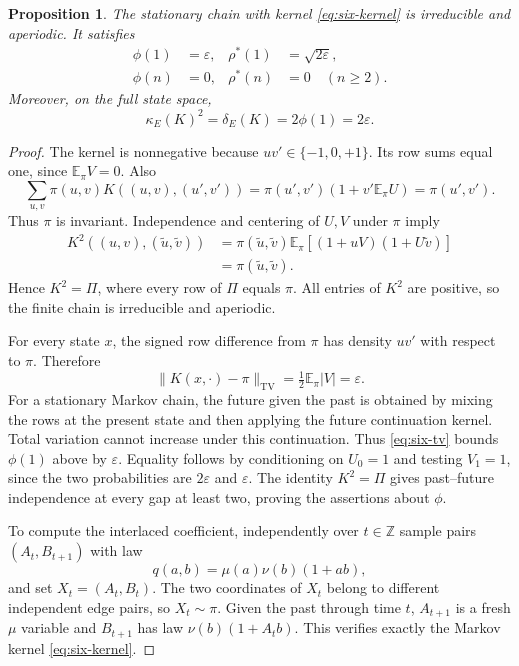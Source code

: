 \documentclass[11pt]{amsart}
\numberwithin{equation}{section}
\newtheorem{proposition}[theorem]{Proposition}
\theoremstyle{definition}
\newcommand{\EE}{\mathbb E}
\newcommand{\ZZ}{\mathbb Z}
\newcommand{\TV}{\mathrm{TV}}
\newcommand{\rhostar}{\rho^{*}}
\begin{document}
\begin{proposition}\label{prop:six}
The stationary chain with kernel \eqref{eq:six-kernel} is irreducible and aperiodic. It satisfies
\begin{align}
\phi(1)&=\varepsilon,&\rhostar(1)&=\sqrt{2\varepsilon},\label{eq:six-exact}\\
\phi(n)&=0,&\rhostar(n)&=0\quad(n\ge2).\label{eq:six-zero}
\end{align}
Moreover, on the full state space,
\begin{equation}\label{eq:six-robust}
\kappa_E(K)^2=\delta_E(K)=2\phi(1)=2\varepsilon.
\end{equation}
\end{proposition}

\begin{proof}
The kernel is nonnegative because $uv'\in\{-1,0,+1\}$. Its row sums equal one, since $\EE_\pi V=0$. Also
\[
\sum_{u,v}\pi(u,v)K((u,v),(u',v'))
=\pi(u',v')(1+v'\EE_\pi U)=\pi(u',v').
\]
Thus $\pi$ is invariant. Independence and centering of $U,V$ under $\pi$ imply
\begin{align*}
K^2((u,v),(\widetilde u,\widetilde v))
&=\pi(\widetilde u,\widetilde v)
  \EE_\pi[(1+uV)(1+U\widetilde v)]\\
&=\pi(\widetilde u,\widetilde v).
\end{align*}
Hence $K^2=\Pi$, where every row of $\Pi$ equals $\pi$. All entries of $K^2$ are positive, so the finite chain is irreducible and aperiodic.

For every state $x$, the signed row difference from $\pi$ has density $uv'$ with respect to $\pi$. Therefore
\begin{equation}\label{eq:six-tv}
\|K(x,\cdot)-\pi\|_{\TV}=\tfrac12\EE_\pi|V|=\varepsilon.
\end{equation}
For a stationary Markov chain, the future given the past is obtained by mixing the rows at the present state and then applying the future continuation kernel. Total variation cannot increase under this continuation. Thus \eqref{eq:six-tv} bounds $\phi(1)$ above by $\varepsilon$. Equality follows by conditioning on $U_0=1$ and testing $V_1=1$, since the two probabilities are $2\varepsilon$ and $\varepsilon$. The identity $K^2=\Pi$ gives past--future independence at every gap at least two, proving the assertions about $\phi$.

To compute the interlaced coefficient, independently over $t\in\ZZ$ sample pairs $(A_t,B_{t+1})$ with law
\begin{equation}\label{eq:independent-edges}
q(a,b)=\mu(a)\nu(b)(1+ab),
\end{equation}
and set $X_t=(A_t,B_t)$. The two coordinates of $X_t$ belong to different independent edge pairs, so $X_t\sim\pi$. Given the past through time $t$, $A_{t+1}$ is a fresh $\mu$ variable and $B_{t+1}$ has law $\nu(b)(1+A_tb)$. This verifies exactly the Markov kernel \eqref{eq:six-kernel}.


\end{proof}
\end{document}
